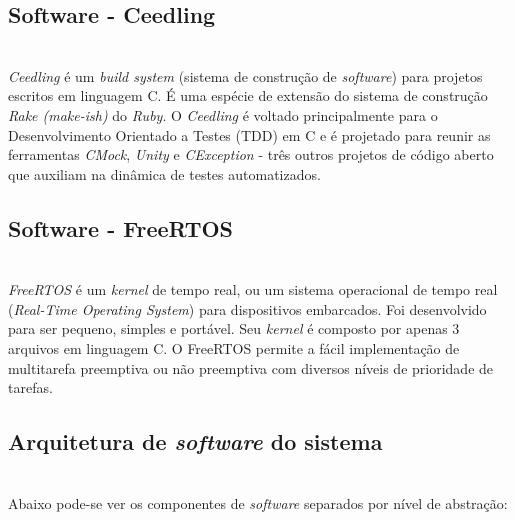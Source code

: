 \documentclass[times, twoside, watermark]{artigo}
\begin{document}
\subsection{Software - Ceedling}\hfill\\
\textit{Ceedling} é um \textit{build system} (sistema de construção de \textit{software}) para projetos escritos em linguagem C.
É uma espécie de extensão do sistema de construção \textit{Rake (make-ish)} do \textit{Ruby}.
O \textit{Ceedling} é voltado principalmente para o Desenvolvimento Orientado a Testes (TDD) em C e é projetado para reunir as ferramentas \textit{CMock},
\textit{Unity} e \textit{CException} - três outros projetos de código aberto que auxiliam na dinâmica de testes automatizados. \cite{gomes2016uttos}


\subsection{Software - FreeRTOS}\hfill\\
\textit{FreeRTOS} é um \textit{kernel} de tempo real, ou um sistema operacional de tempo real (\textit{Real-Time Operating System}) 
para dispositivos embarcados. Foi desenvolvido para ser pequeno, simples e portável. 
Seu \textit{kernel} é composto por apenas 3 arquivos em linguagem C. 
O FreeRTOS permite a fácil implementação de multitarefa preemptiva ou não preemptiva com diversos níveis de prioridade de tarefas.\cite{zhu2016understanding}


\subsection{Arquitetura de \textit{software} do sistema}\hfill\\
Abaixo pode-se ver os componentes de \textit{software} separados por nível de abstração:





\end{document}

